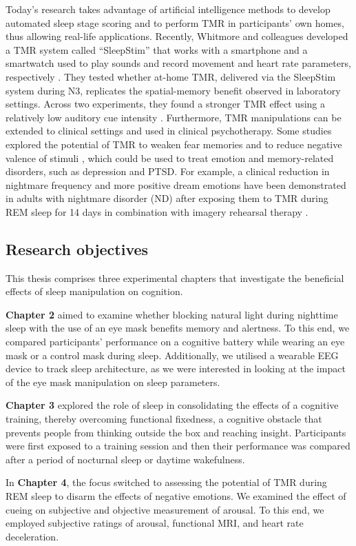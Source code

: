 Today’s research takes advantage of artificial intelligence methods to develop automated sleep stage scoring and to perform TMR in participants’ own homes, thus allowing real-life applications. Recently, Whitmore and colleagues developed a TMR system called “SleepStim” that works with a smartphone and a smartwatch used to play sounds and record movement and heart rate parameters, respectively \parencite{whitmore_improving_2022}. They tested whether at-home TMR, delivered via the SleepStim system during N3, replicates the spatial-memory benefit observed in laboratory settings. Across two experiments, they found a stronger TMR effect using a relatively low auditory cue intensity \parencite{whitmore_improving_2022}. Furthermore, TMR manipulations can be extended to clinical settings and used in clinical psychotherapy. Some studies explored the potential of TMR to weaken fear memories \parencite{hauner_stimulus-specific_2013,oudiette_fear_2014} and to reduce negative valence of stimuli \parencite{hutchison_targeted_2021,rihm_replay_2015}, which could be used to treat emotion and memory-related disorders, such as depression and PTSD. For example, a clinical reduction in nightmare frequency and more positive dream emotions have been demonstrated in adults with nightmare disorder (ND) after exposing them to TMR during REM sleep for 14 days in combination with imagery rehearsal therapy \parencite{schwartz_enhancing_2022}. 

\subsection{Research objectives}
This thesis comprises three experimental chapters that investigate the beneficial effects of sleep manipulation on cognition. 

\textbf{Chapter 2 }aimed to examine whether blocking natural light during nighttime sleep with the use of an eye mask benefits memory and alertness. To this end, we compared participants’ performance on a cognitive battery while wearing an eye mask or a control mask during sleep. Additionally, we utilised a wearable EEG device to track sleep architecture, as we were interested in looking at the impact of the eye mask manipulation on sleep parameters.

\textbf{Chapter 3} explored the role of sleep in consolidating the effects of a cognitive training, thereby overcoming functional fixedness, a cognitive obstacle that prevents people from thinking outside the box and reaching insight. Participants were first exposed to a training session and then their performance was compared after a period of nocturnal sleep or daytime wakefulness. 

In \textbf{Chapter 4}, the focus switched to assessing the potential of TMR during REM sleep to disarm the effects of negative emotions. We examined the effect of cueing on subjective and objective measurement of arousal. To this end, we employed subjective ratings of arousal, functional MRI, and heart rate deceleration.  


